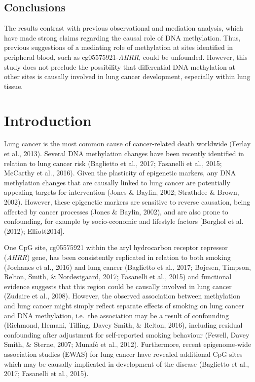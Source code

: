 \documentclass[11pt,twoside]{bristolthesis}
\begin{document}
\hypertarget{conclusions}{%
\subsection{Conclusions}\label{conclusions}}

The results contrast with previous observational and mediation analysis, which have made strong claims regarding the causal role of DNA methylation. Thus, previous suggestions of a mediating role of methylation at sites identified in peripheral blood, such as cg05575921-\emph{AHRR}, could be unfounded. However, this study does not preclude the possibility that differential DNA methylation at other sites is causally involved in lung cancer development, especially within lung tissue.

\hypertarget{introduction-2}{%
\section{Introduction}\label{introduction-2}}

Lung cancer is the most common cause of cancer-related death worldwide (Ferlay et al., 2013). Several DNA methylation changes have been recently identified in relation to lung cancer risk (Baglietto et al., 2017; Fasanelli et al., 2015; McCarthy et al., 2016). Given the plasticity of epigenetic markers, any DNA methylation changes that are causally linked to lung cancer are potentially appealing targets for intervention (Jones \& Baylin, 2002; Strathdee \& Brown, 2002). However, these epigenetic markers are sensitive to reverse causation, being affected by cancer processes (Jones \& Baylin, 2002), and are also prone to confounding, for example by socio-economic and lifestyle factors {[}Borghol et al. (2012); Elliott2014{]}.

One CpG site, cg05575921 within the aryl hydrocarbon receptor repressor (\emph{AHRR}) gene, has been consistently replicated in relation to both smoking (Joehanes et al., 2016) and lung cancer (Baglietto et al., 2017; Bojesen, Timpson, Relton, Smith, \& Nordestgaard, 2017; Fasanelli et al., 2015) and functional evidence suggests that this region could be causally involved in lung cancer (Zudaire et al., 2008). However, the observed association between methylation and lung cancer might simply reflect separate effects of smoking on lung cancer and DNA methylation, i.e.~the association may be a result of confounding (Richmond, Hemani, Tilling, Davey Smith, \& Relton, 2016), including residual confounding after adjustment for self-reported smoking behaviour (Fewell, Davey Smith, \& Sterne, 2007; Munafò et al., 2012). Furthermore, recent epigenome-wide association studies (EWAS) for lung cancer have revealed additional CpG sites which may be causally implicated in development of the disease (Baglietto et al., 2017; Fasanelli et al., 2015).
\end{document}

